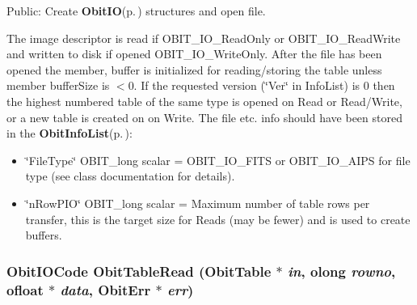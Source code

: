 Public: Create {\bf Obit\-IO}{\rm (p.\,\pageref{structObitIO})} structures and open file. 

The image descriptor is read if OBIT\_\-IO\_\-Read\-Only or OBIT\_\-IO\_\-Read\-Write and written to disk if opened OBIT\_\-IO\_\-Write\-Only. After the file has been opened the member, buffer is initialized for reading/storing the table unless member buffer\-Size is $<$0. If the requested version (\char`\"{}Ver\char`\"{} in Info\-List) is 0 then the highest numbered table of the same type is opened on Read or Read/Write, or a new table is created on on Write. The file etc. info should have been stored in the {\bf Obit\-Info\-List}{\rm (p.\,\pageref{structObitInfoList})}: \begin{itemize}
\item \char`\"{}File\-Type\char`\"{} OBIT\_\-long scalar = OBIT\_\-IO\_\-FITS or OBIT\_\-IO\_\-AIPS for file type (see class documentation for details). \item \char`\"{}n\-Row\-PIO\char`\"{} OBIT\_\-long scalar = Maximum number of table rows per transfer, this is the target size for Reads (may be fewer) and is used to create buffers. 
\end{itemize}
\subsubsection{\setlength{\rightskip}{0pt plus 5cm}Obit\-IOCode Obit\-Table\-Read ({\bf Obit\-Table} $\ast$ {\em in}, {\bf olong} {\em rowno}, {\bf ofloat} $\ast$ {\em data}, {\bf Obit\-Err} $\ast$ {\em err})}\label{ObitTable_8h_a41}


